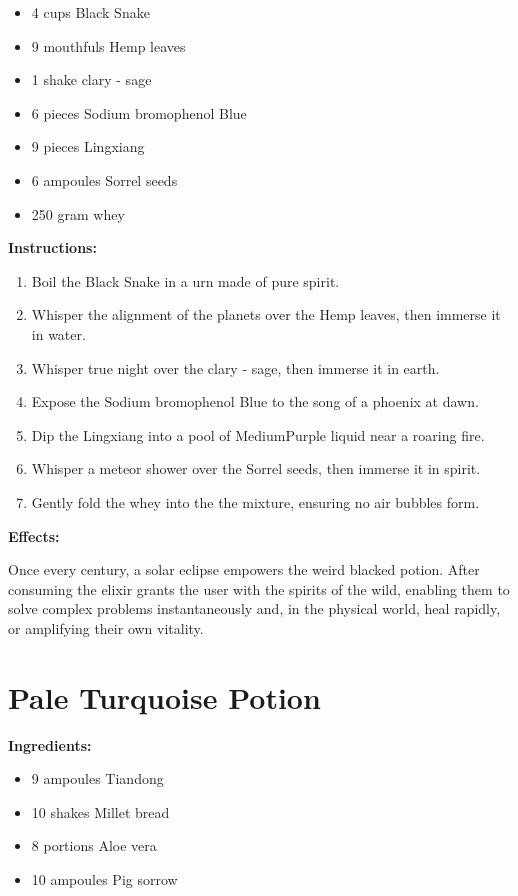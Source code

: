 \documentclass{article}
\begin{document}
\begin{itemize}
  \item 4 cups Black Snake
  \item 9 mouthfuls Hemp leaves
  \item 1 shake clary - sage
  \item 6 pieces Sodium bromophenol Blue
  \item 9 pieces Lingxiang
  \item 6 ampoules Sorrel seeds
  \item 250 gram whey
\end{itemize}

\textbf{Instructions:}

\begin{enumerate}
  \item Boil the Black Snake in a urn made of pure spirit.
  \item Whisper the alignment of the planets over the Hemp leaves, then immerse it in water.
  \item Whisper true night over the clary - sage, then immerse it in earth.
  \item Expose the Sodium bromophenol Blue to the song of a phoenix at dawn.
  \item Dip the Lingxiang into a pool of MediumPurple liquid near a roaring fire.
  \item Whisper a meteor shower over the Sorrel seeds, then immerse it in spirit.
  \item Gently fold the whey into the the mixture, ensuring no air bubbles form.
\end{enumerate}

\textbf{Effects:}

Once every century, a solar eclipse empowers the weird blacked potion. After consuming the elixir grants the user with the spirits of the wild, enabling them to solve complex problems instantaneously and, in the physical world, heal rapidly, or amplifying their own vitality.

\newpage
\section*{Pale Turquoise Potion}

\textbf{Ingredients:}

\begin{itemize}
  \item 9 ampoules Tiandong
  \item 10 shakes Millet bread
  \item 8 portions Aloe vera
  \item 10 ampoules Pig sorrow
\end{itemize}
\end{document}
